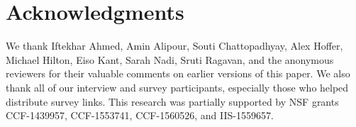 \section*{Acknowledgments}

We thank Iftekhar Ahmed, Amin Alipour, Souti Chattopadhyay, Alex Hoffer, Michael Hilton, Eiso Kant, Sarah Nadi, Sruti Ragavan, and the anonymous reviewers for their valuable comments on earlier versions of this paper.
We also thank all of our interview and survey participants, especially those who helped distribute survey links.
This research was partially supported by NSF grants CCF-1439957, CCF-1553741, CCF-1560526, and IIS-1559657.
